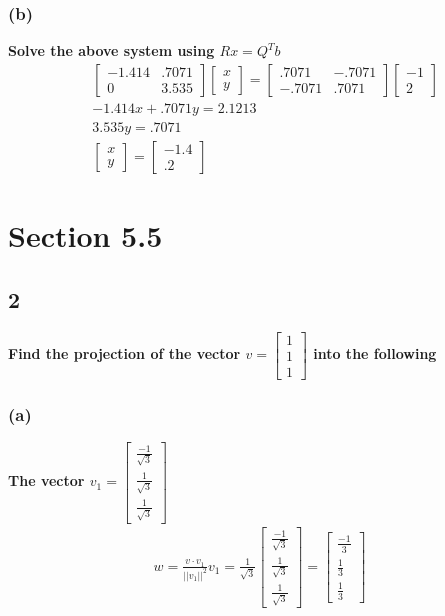 \documentclass[10pt,letterpaper]{article}
\begin{document}
	\subsubsection*{(b)} \textbf{Solve the above system using $Rx = Q^Tb$}
	\begin{align*}
	& \begin{bmatrix}
	-1.414 & .7071  \\ 0 & 3.535
	\end{bmatrix} \begin{bmatrix}
	x \\ y
	\end{bmatrix} = \begin{bmatrix}
	.7071 & -.7071 \\ -.7071 & .7071 
	\end{bmatrix} \begin{bmatrix}
	-1 \\ 2
	\end{bmatrix} \\ 
	& -1.414x + .7071y = 2.1213 \\ 
	& 3.535y = .7071 \\ 
	& \boxed{\begin{bmatrix}
		x \\ y
		\end{bmatrix} = \begin{bmatrix}
		-1.4 \\ .2
		\end{bmatrix}}
	\end{align*}
	\section*{Section 5.5}
	\subsection*{2} \textbf{Find the projection of the vector $v = \begin{bmatrix}
		1 \\ 1 \\ 1
		\end{bmatrix}$ into the following}
		\subsubsection*{(a)} \textbf{The vector $v_1 = \begin{bmatrix}
			\frac{-1}{\sqrt{3}} \\ \frac{1}{\sqrt{3}} \\ \frac{1}{\sqrt{3}}
			\end{bmatrix}$} 
		\begin{align*}
		w = \frac{v \cdot v_1}{||v_1||^2}v_1 = \frac{1}{\sqrt{3}} \begin{bmatrix}
		\frac{-1}{\sqrt{3}} \\ \frac{1}{\sqrt{3}} \\ \frac{1}{\sqrt{3}}
		\end{bmatrix} = \boxed{ \begin{bmatrix}
		\frac{-1}{3} \\ \frac{1}{3} \\ \frac{1}{3}
 		\end{bmatrix} }
		\end{align*}
\end{document}

